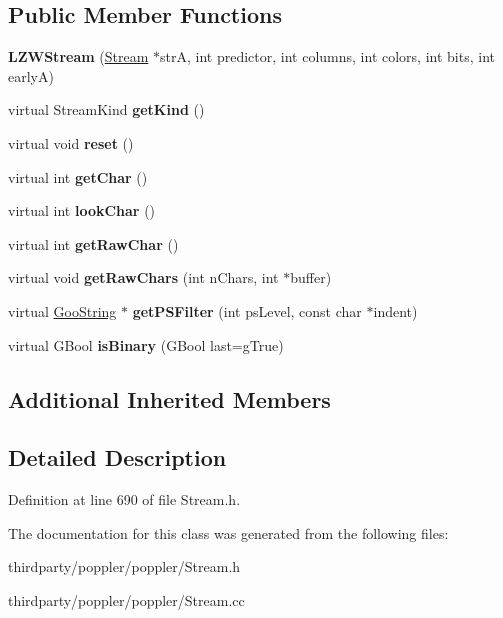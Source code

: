 \subsection*{Public Member Functions}
\begin{DoxyCompactItemize}
\item 
\mbox{\label{class_l_z_w_stream_a8d6474118418ce011ff66d3af4177c00}} 
{\bfseries L\+Z\+W\+Stream} (\hyperlink{class_stream}{Stream} $\ast$strA, int predictor, int columns, int colors, int bits, int earlyA)
\item 
\mbox{\label{class_l_z_w_stream_a33dff3e4023865414d06442b39bc5f9d}} 
virtual Stream\+Kind {\bfseries get\+Kind} ()
\item 
\mbox{\label{class_l_z_w_stream_af65cf5cfcdabb4c9c97f19574c0353db}} 
virtual void {\bfseries reset} ()
\item 
\mbox{\label{class_l_z_w_stream_a93f22d2ef92813662858dc1919e7b7d1}} 
virtual int {\bfseries get\+Char} ()
\item 
\mbox{\label{class_l_z_w_stream_a187e768f382dfca56711a7151d8702c3}} 
virtual int {\bfseries look\+Char} ()
\item 
\mbox{\label{class_l_z_w_stream_a6cc014c29d3e71683feb44a0d0d0a3e3}} 
virtual int {\bfseries get\+Raw\+Char} ()
\item 
\mbox{\label{class_l_z_w_stream_a4cbd61d807959078549aa356589711eb}} 
virtual void {\bfseries get\+Raw\+Chars} (int n\+Chars, int $\ast$buffer)
\item 
\mbox{\label{class_l_z_w_stream_a83c0baf78358bab160b9d38e1c53a1b4}} 
virtual \hyperlink{class_goo_string}{Goo\+String} $\ast$ {\bfseries get\+P\+S\+Filter} (int ps\+Level, const char $\ast$indent)
\item 
\mbox{\label{class_l_z_w_stream_ab6be6f1a6a4ecc665545863be0165306}} 
virtual G\+Bool {\bfseries is\+Binary} (G\+Bool last=g\+True)
\end{DoxyCompactItemize}
\subsection*{Additional Inherited Members}


\subsection{Detailed Description}


Definition at line 690 of file Stream.\+h.



The documentation for this class was generated from the following files\+:\begin{DoxyCompactItemize}
\item 
thirdparty/poppler/poppler/Stream.\+h\item 
thirdparty/poppler/poppler/Stream.\+cc\end{DoxyCompactItemize}
